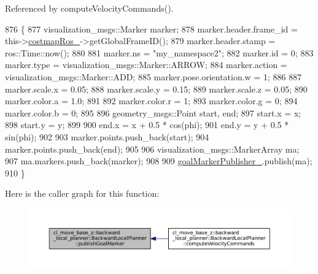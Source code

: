 Referenced by compute\+Velocity\+Commands().


\begin{DoxyCode}
876         \{
877             visualization\_msgs::Marker marker;
878             marker.header.frame\_id = this->\hyperlink{classcl__move__base__z_1_1backward__local__planner_1_1BackwardLocalPlanner_a4136268882a105d9e06e173d85d5c0dc}{costmapRos\_}->getGlobalFrameID();
879             marker.header.stamp = ros::Time::now();
880 
881             marker.ns = \textcolor{stringliteral}{"my\_namespace2"};
882             marker.id = 0;
883             marker.type = visualization\_msgs::Marker::ARROW;
884             marker.action = visualization\_msgs::Marker::ADD;
885             marker.pose.orientation.w = 1;
886 
887             marker.scale.x = 0.05;
888             marker.scale.y = 0.15;
889             marker.scale.z = 0.05;
890             marker.color.a = 1.0;
891 
892             marker.color.r = 1;
893             marker.color.g = 0;
894             marker.color.b = 0;
895 
896             geometry\_msgs::Point start, end;
897             start.x = x;
898             start.y = y;
899 
900             end.x = x + 0.5 * cos(phi);
901             end.y = y + 0.5 * sin(phi);
902 
903             marker.points.push\_back(start);
904             marker.points.push\_back(end);
905 
906             visualization\_msgs::MarkerArray ma;
907             ma.markers.push\_back(marker);
908 
909             \hyperlink{classcl__move__base__z_1_1backward__local__planner_1_1BackwardLocalPlanner_a79f0ddfa686e2cd47bbc2f0bac9f3d4c}{goalMarkerPublisher\_}.publish(ma);
910         \}
\end{DoxyCode}
Here is the caller graph for this function\+:
\nopagebreak
\begin{figure}[H]
\begin{center}
\leavevmode
\includegraphics[width=350pt]{classcl__move__base__z_1_1backward__local__planner_1_1BackwardLocalPlanner_a70eaeb6cf31fd3378d9fbf9bcb975995_icgraph}
\end{center}
\end{figure}
\mbox{\label{classcl__move__base__z_1_1backward__local__planner_1_1BackwardLocalPlanner_a62e4783adae03ce92190d855a021b91d}} 
